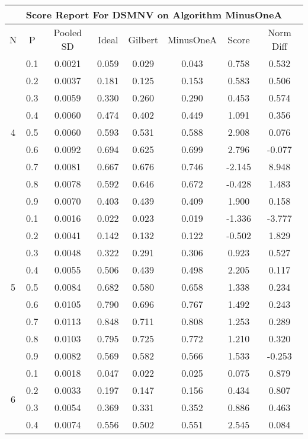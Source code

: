 \documentclass[11pt,a4paper]{report}
\begin{document}
\begin{longtable}{ | c | c || c | c | c | c | c | c | }
\hline
\multicolumn{8}{|c|}{ Score Report For DSMNV on Algorithm MinusOneA} \\
\hline
N & P & Pooled SD &  Ideal &  Gilbert & MinusOneA  & Score & Norm Diff \\
 \hline
 \hline
 \endhead
\multirow{9}{*}{4} & 0.1 & 0.0021 & 0.059 & 0.029 & 0.043 & 0.758 & 0.532 \\
 & 0.2 & 0.0037 & 0.181 & 0.125 & 0.153 & 0.583 & 0.506 \\
 & 0.3 & 0.0059 & 0.330 & 0.260 & 0.290 & 0.453 & 0.574 \\
 & 0.4 & 0.0060 & 0.474 & 0.402 & 0.449 & 1.091 & 0.356 \\
 & 0.5 & 0.0060 & 0.593 & 0.531 & 0.588 & 2.908 & 0.076 \\
 & 0.6 & 0.0092 & 0.694 & 0.625 & 0.699 & 2.796 & -0.077 \\
 & 0.7 & 0.0081 & 0.667 & 0.676 & 0.746 & -2.145 & 8.948 \\
 & 0.8 & 0.0078 & 0.592 & 0.646 & 0.672 & -0.428 & 1.483 \\
 & 0.9 & 0.0070 & 0.403 & 0.439 & 0.409 & 1.900 & 0.158 \\
 \hline
\multirow{9}{*}{5} & 0.1 & 0.0016 & 0.022 & 0.023 & 0.019 & -1.336 & -3.777 \\
 & 0.2 & 0.0041 & 0.142 & 0.132 & 0.122 & -0.502 & 1.829 \\
 & 0.3 & 0.0048 & 0.322 & 0.291 & 0.306 & 0.923 & 0.527 \\
 & 0.4 & 0.0055 & 0.506 & 0.439 & 0.498 & 2.205 & 0.117 \\
 & 0.5 & 0.0084 & 0.682 & 0.580 & 0.658 & 1.338 & 0.234 \\
 & 0.6 & 0.0105 & 0.790 & 0.696 & 0.767 & 1.492 & 0.243 \\
 & 0.7 & 0.0113 & 0.848 & 0.711 & 0.808 & 1.253 & 0.289 \\
 & 0.8 & 0.0103 & 0.795 & 0.725 & 0.772 & 1.210 & 0.320 \\
 & 0.9 & 0.0082 & 0.569 & 0.582 & 0.566 & 1.533 & -0.253 \\
 \hline
\multirow{9}{*}{6} & 0.1 & 0.0018 & 0.047 & 0.022 & 0.025 & 0.075 & 0.879 \\
 & 0.2 & 0.0033 & 0.197 & 0.147 & 0.156 & 0.434 & 0.807 \\
 & 0.3 & 0.0054 & 0.369 & 0.331 & 0.352 & 0.886 & 0.463 \\
 & 0.4 & 0.0074 & 0.556 & 0.502 & 0.551 & 2.545 & 0.084 \\

\end{longtable}
\end{document}
